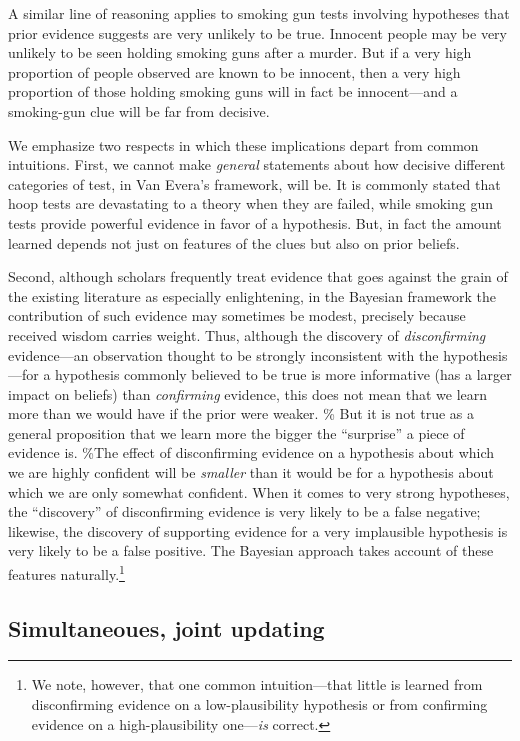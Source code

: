 \documentclass[12pt,]{book}
\let\rmarkdownfootnote\footnote%
\def\footnote{\protect\rmarkdownfootnote}
\begin{document}
A similar line of reasoning applies to smoking gun tests involving hypotheses that prior evidence suggests are very unlikely to be true. Innocent people may be very unlikely to be seen holding smoking guns after a murder. But if a very high proportion of people observed are known to be innocent, then a very high proportion of those holding smoking guns will in fact be innocent---and a smoking-gun clue will be far from decisive.

We emphasize two respects in which these implications depart from common intuitions. First, we cannot make \emph{general} statements about how decisive different categories of test, in Van Evera's framework, will be. It is commonly stated that hoop tests are devastating to a theory when they are failed, while smoking gun tests provide powerful evidence in favor of a hypothesis. But, in fact the amount learned depends not just on features of the clues but also on prior beliefs.

Second, although scholars frequently treat evidence that goes against the grain of the existing literature as especially enlightening, in the Bayesian framework the contribution of such evidence may sometimes be modest, precisely because received wisdom carries weight. Thus, although the discovery of \emph{disconfirming} evidence---an observation thought to be strongly inconsistent with the hypothesis---for a hypothesis commonly believed to be true is more informative (has a larger impact on beliefs) than \emph{confirming} evidence, this does not mean that we learn more than we would have if the prior were weaker. \% But it is not true as a general proposition that we learn more the bigger the ``surprise'' a piece of evidence is.
\%The effect of disconfirming evidence on a hypothesis about which we are highly confident will be \emph{smaller} than it would be for a hypothesis about which we are only somewhat confident.
When it comes to very strong hypotheses, the ``discovery'' of disconfirming evidence is very likely to be a false negative; likewise, the discovery of supporting evidence for a very implausible hypothesis is very likely to be a false positive. The Bayesian approach takes account of these features naturally.\footnote{We note, however, that one common intuition---that little is learned from disconfirming evidence on a low-plausibility hypothesis or from confirming evidence on a high-plausibility one---\emph{is} correct.}

\hypertarget{simultaneoues-joint-updating}{%
\subsection{Simultaneoues, joint updating}\label{simultaneoues-joint-updating}}
\end{document}
